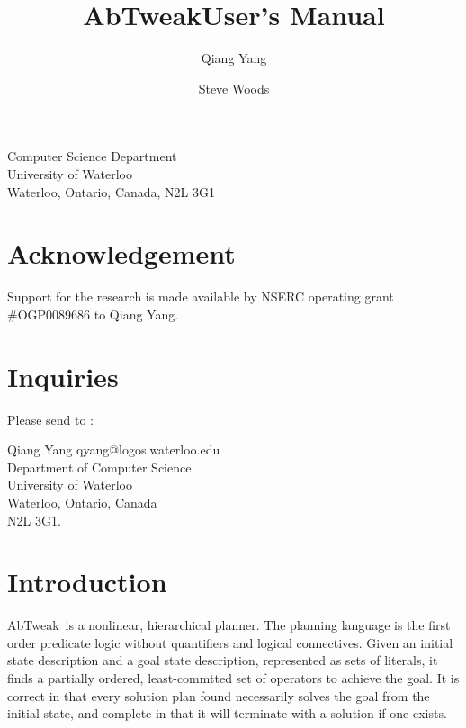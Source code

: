 
\newcommand{\tweak}{{\rm Tweak}}
\newcommand{\sipe}{{\rm Sipe}}
\newcommand{\noah}{{\rm Noah}}
\newcommand{\nonlin}{{\rm Nonlin}}
\newcommand{\abtweak}{{\rm AbTweak}}

\title{\abtweak User's Manual}

\author{Qiang Yang \and Steve Woods}

\date{}



\maketitle
\begin{center}
Computer Science Department \\ University of Waterloo \\ Waterloo,
Ontario, Canada, N2L 3G1\\
\end{center}

\section*{Acknowledgement}
Support for the research is made available by NSERC operating grant
\#OGP0089686 to Qiang Yang.

\section*{Inquiries}
Please send to :

Qiang Yang qyang@logos.waterloo.edu\\
Department of Computer Science\\
University of Waterloo\\
Waterloo, Ontario, Canada\\
N2L 3G1.

\newpage

\section{Introduction}
\abtweak\ is a nonlinear, hierarchical planner.  
The planning language is the first order predicate logic without
quantifiers and logical connectives.  Given an initial state
description and a goal state description, represented as sets of
literals, it finds a partially ordered, least-commtted set of
operators to achieve the goal.  It is correct in that every solution
plan found necessarily solves the goal from the initial state, and
complete in that it will terminate with a solution if one exists.


